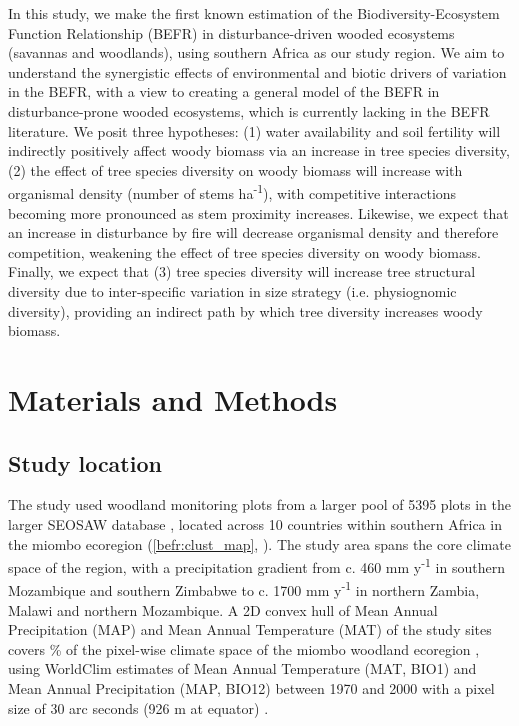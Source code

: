 \begin{refsection}
In this study, we make the first known estimation of the Biodiversity-Ecosystem Function Relationship (BEFR) in disturbance-driven wooded ecosystems (savannas and woodlands), using southern Africa as our study region. We aim to understand the synergistic effects of environmental and biotic drivers of variation in the BEFR, with a view to creating a general model of the BEFR in disturbance-prone wooded ecosystems, which is currently lacking in the BEFR literature. We posit three hypotheses: (1) water availability and soil fertility will indirectly positively affect woody biomass via an increase in tree species diversity, (2) the effect of tree species diversity on woody biomass will increase with organismal density (number of stems ha\textsuperscript{-1}), with competitive interactions becoming more pronounced as stem proximity increases. Likewise, we expect that an increase in disturbance by fire will decrease organismal density and therefore competition, weakening the effect of tree species diversity on woody biomass. Finally, we expect that (3) tree species diversity will increase tree structural diversity due to inter-specific variation in size strategy (i.e. physiognomic diversity), providing an indirect path by which tree diversity increases woody biomass.

\section{Materials and Methods}
\label{befr:sec:methods}

\subsection{Study location}
\label{befr:ssec:location}

The study used \nplots{} woodland monitoring plots from a larger pool of 5395 plots in the larger SEOSAW database \citep{SEOSAW2020}, located across 10 countries within southern Africa in the miombo ecoregion (\autoref{befr:clust_map}, \citealp{White1983}). The study area spans the core climate space of the region, with a precipitation gradient from c. 460 mm y\textsuperscript{-1} in southern Mozambique and southern Zimbabwe to c. 1700 mm y\textsuperscript{-1} in northern Zambia, Malawi and northern Mozambique. A 2D convex hull of Mean Annual Precipitation (MAP) and Mean Annual Temperature (MAT) of the study sites covers \hullcover{}\% of the pixel-wise climate space of the miombo woodland ecoregion \citep{White1983}, using WorldClim estimates of Mean Annual Temperature (MAT, BIO1) and Mean Annual Precipitation (MAP, BIO12) between 1970 and 2000 with a pixel size of 30 arc seconds (926 m at equator) \citep{Fick2017}. 


\end{refsection}

